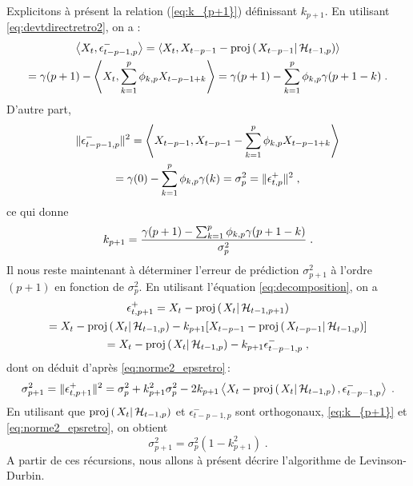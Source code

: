 Explicitons \`a pr\'esent la relation (\ref{eq:k_{p+1}}) d\'efinissant
$k_{p+1}$. En utilisant \eqref{eq:devtdirectretro2}, on a :
\begin{multline*}
\pscal{X_t}{\epsilon_{t-p-1,p}^-}
            = \pscal{X_{t}}{X_{t-p-1} - \proj{X_{t-p-1}}{\cH_{t-1,p}}}\\
            = \gamma(p+1) - \pscal{X_t}{\sum_{k=1}^{p} \phi_{k,p} X_{t-p-1+k}}
            = \gamma(p+1) - \sum_{k=1}^{p} \phi_{k,p} \gamma(p+1-k)\;.
\end{multline*}
D'autre part,
\begin{multline}\label{eq:norme2_epsretro}
\|\epsilon_{t-p-1,p}^-\|^2=\left\langle X_{t-p-1}, X_{t-p-1}-\sum_{k=1}^{p}
  \phi_{k,p} X_{t-p-1+k} \right\rangle\\
=\gamma(0)-\sum_{k=1}^{p} \phi_{k,p}\gamma(k)
=\sigma_p^2=\|\epsilon_{t,p}^+\|^2\;,
\end{multline}
ce qui donne
\begin{equation}\label{eq:def:k_{p+1}}
  k_{p+1}=
   \frac{\gamma(p+1) - \sum_{k=1}^{p} \phi_{k,p} \gamma(p+1-k)}
   {\sigma_p^2}\;.
 \end{equation}
 Il nous reste maintenant \`a d\'eterminer l'erreur de pr\'ediction
${\sigma_{p+1}^2}$ \`a l'ordre $(p+1)$ en fonction de $\sigma_p^2$.
En utilisant l'\'equation \eqref{eq:decomposition}, on a
\begin{multline*}
 \epsilon_{t,p+1}^+ =X_{t} - \proj{X_{t}}{\cH_{t-1,p+1}} \\
 = X_{t} - \proj{X_{t}}{\cH_{t-1,p}} - k_{p+1}
[X_{t-p-1} - \proj{X_{t-p-1}}{\cH_{t-1,p}}]\\
=X_{t} - \proj{X_{t}}{\cH_{t-1,p}} - k_{p+1}\epsilon_{t-p-1,p}^-\;,
\end{multline*}
dont on d\'eduit d'apr\`es \eqref{eq:norme2_epsretro}\,:
\begin{multline*}
  \sigma_{p+1}^2=\|\epsilon_{t,p+1}^+\|^2
=\sigma_p^2+ k_{p+1}^2 \sigma_p^2-2k_{p+1}\pscal{X_{t} - \proj{X_{t}}{\cH_{t-1,p}}}{\epsilon_{t-p-1,p}^-}\;.
\end{multline*}
En utilisant que $\proj{X_{t}}{\cH_{t-1,p}}$ et $\epsilon_{t-p-1,p}^-$
sont orthogonaux, \eqref{eq:k_{p+1}} et \eqref{eq:norme2_epsretro}, on
obtient
\begin{equation}\label{eq:recursion_sigma_p+1}
 \sigma_{p+1}^2=\sigma_p^2 (1 - k_{p+1}^2)\;.
\end{equation}
A partir de ces r\'ecursions, nous allons \`a pr\'esent d\'ecrire l'algorithme
de Levinson-Durbin.



